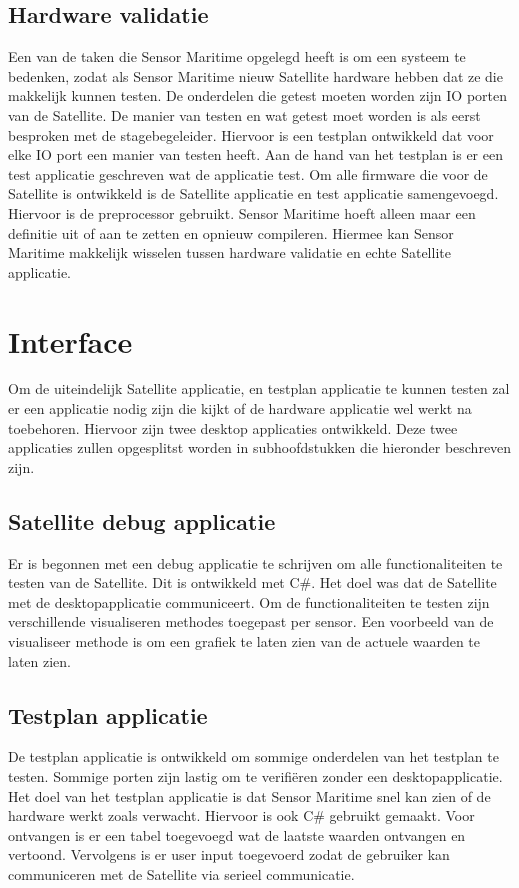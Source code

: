 \subsection{Hardware validatie}
Een van de taken die Sensor Maritime opgelegd heeft is om een systeem te bedenken, zodat als Sensor Maritime nieuw Satellite hardware hebben dat ze die makkelijk kunnen testen. De onderdelen die getest moeten worden zijn IO porten van de Satellite. De manier van testen en wat getest moet worden is als eerst besproken met de stagebegeleider. Hiervoor is een testplan ontwikkeld dat voor elke IO port een manier van testen heeft. Aan de hand van het testplan is er een test applicatie geschreven wat de applicatie test. Om alle firmware die voor de Satellite is ontwikkeld is de Satellite applicatie en test applicatie samengevoegd. Hiervoor is de preprocessor gebruikt. Sensor Maritime hoeft alleen maar een definitie uit of aan te zetten en opnieuw compileren. Hiermee kan Sensor Maritime makkelijk wisselen tussen hardware validatie en echte Satellite applicatie.

\section{Interface}
Om de uiteindelijk Satellite applicatie, en testplan applicatie te kunnen testen zal er een applicatie nodig zijn die kijkt of de hardware applicatie wel werkt na toebehoren. Hiervoor zijn twee desktop applicaties ontwikkeld. Deze twee applicaties zullen opgesplitst worden in subhoofdstukken die hieronder beschreven zijn.

\subsection{Satellite debug applicatie}
Er is begonnen met een debug applicatie te schrijven om alle functionaliteiten te testen van de Satellite. Dit is ontwikkeld met C\#. Het doel was dat de Satellite met de desktopapplicatie communiceert. Om de functionaliteiten te testen zijn verschillende visualiseren methodes toegepast per sensor. Een voorbeeld van de visualiseer methode is om een grafiek te laten zien van de actuele waarden te laten zien. 

\subsection{Testplan applicatie}
De testplan applicatie is ontwikkeld om sommige onderdelen van het testplan te testen. Sommige porten zijn lastig om te verifiëren zonder een desktopapplicatie. Het doel van het testplan applicatie is dat Sensor Maritime snel kan zien of de hardware werkt zoals verwacht. Hiervoor is ook C\# gebruikt gemaakt. Voor ontvangen is er een tabel toegevoegd wat de laatste waarden ontvangen en vertoond. Vervolgens is er user input toegevoerd zodat de gebruiker kan communiceren met de Satellite via serieel communicatie.

